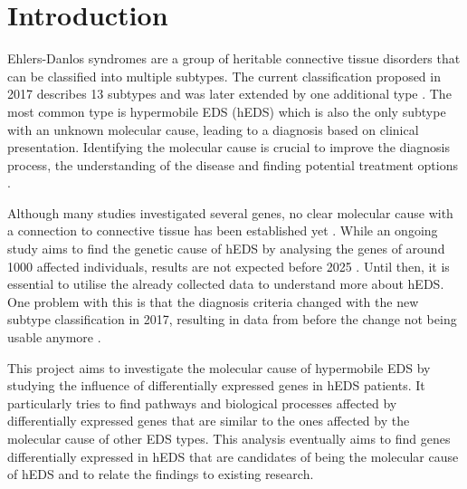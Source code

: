 \section{Introduction}


Ehlers-Danlos syndromes are a group of heritable connective tissue disorders that can be classified into multiple subtypes. The current classification proposed in 2017 describes 13 subtypes \cite{classification2017} and was later extended by one additional type \cite{Malfait2020}. The most common type is hypermobile EDS (hEDS) which is also the only subtype with an unknown molecular cause, leading to a diagnosis based on clinical presentation. Identifying the molecular cause is crucial to improve the diagnosis process, the understanding of the disease and finding potential treatment options \cite{Ritelli2020}.

Although many studies investigated several genes, no clear molecular cause with a connection to connective tissue has been established yet \cite{Caliogna2021}. While an ongoing study aims to find the genetic cause of hEDS by analysing the genes of around 1000 affected individuals, results are not expected before 2025 \cite{HEDGE}. Until then, it is essential to utilise the already collected data to understand more about hEDS. One problem with this is that the diagnosis criteria changed with the new subtype classification in 2017, resulting in data from before the change not being usable anymore \cite{Gensemer2021, Ritelli2022}.
%
%

This project aims to investigate the molecular cause of hypermobile EDS by studying the influence of differentially expressed genes in hEDS patients. It particularly tries to find pathways and biological processes affected by differentially expressed genes that are similar to the ones affected by the molecular cause of other EDS types. This analysis eventually aims to find genes differentially expressed in hEDS that are candidates of being the molecular cause of hEDS and to relate the findings to existing research.